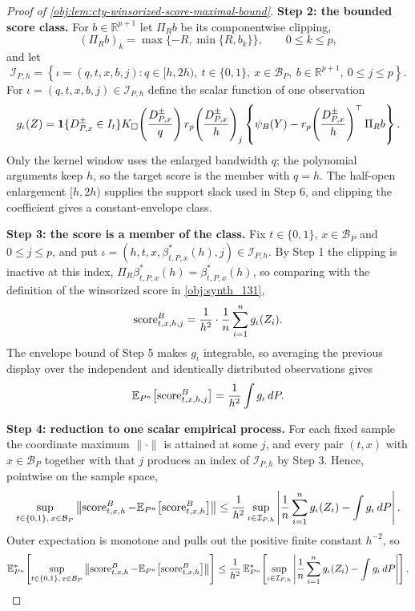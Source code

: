 \begin{proof}[Proof of \cref{obj:lem:cty-winsorized-score-maximal-bound}]
\textbf{Step 2: the bounded score class.}  For \(b\in\mathbb R^{p+1}\) let \(\Pi_R b\) be its componentwise clipping,
\[
(\Pi_R b)_k=\max\{-R,\min\{R,b_k\}\},\qquad 0\leq k\leq p,
\]
and let
\[
\mathcal I_{P,h}
=
\left\{
\iota=(q,t,x,b,j):
q\in[h,2h),\ t\in\{0,1\},\ x\in\mathcal B_P,\ b\in\mathbb R^{p+1},\ 0\leq j\leq p
\right\}.
\]
For \(\iota=(q,t,x,b,j)\in\mathcal I_{P,h}\) define the scalar function of one observation
\[
g_\iota(Z)
=
\mathbf 1\{D^{\pm}_{P,x}\in I_t\}
K_\square\!\left({D^{\pm}_{P,x}\over q}\right)
r_p\!\left({D^{\pm}_{P,x}\over h}\right)_j
\left\{
\psi_B(Y)-r_p\!\left({D^{\pm}_{P,x}\over h}\right)^\top\Pi_R b
\right\}.
\]
Only the kernel window uses the enlarged bandwidth \(q\); the polynomial arguments keep \(h\), so the target score is the member with \(q=h\).  The half-open enlargement \([h,2h)\) supplies the support slack used in Step 6, and clipping the coefficient gives a constant-envelope class.

\textbf{Step 3: the score is a member of the class.}  Fix \(t\in\{0,1\}\), \(x\in\mathcal B_P\) and \(0\leq j\leq p\), and put \(\iota=(h,t,x,\beta^*_{t,P,x}(h),j)\in\mathcal I_{P,h}\).  By Step 1 the clipping is inactive at this index, \(\Pi_R\beta^*_{t,P,x}(h)=\beta^*_{t,P,x}(h)\), so comparing with the definition of the winsorized score in \cref{obj:synth_131},
\[
\operatorname{score}^{B}_{t,x,h,j}
=
{1\over h^{2}}\cdot{1\over n}\sum_{i=1}^n g_\iota(Z_i).
\]
The envelope bound of Step 5 makes \(g_\iota\) integrable, so averaging the previous display over the independent and identically distributed observations gives
\[
\mathbb E_{P^n}\!\left[\operatorname{score}^{B}_{t,x,h,j}\right]
=
{1\over h^{2}}\int g_\iota\,dP .
\]

\textbf{Step 4: reduction to one scalar empirical process.}  For each fixed sample the coordinate maximum \(\lVert\cdot\rVert\) is attained at some \(j\), and every pair \((t,x)\) with \(x\in\mathcal B_P\) together with that \(j\) produces an index of \(\mathcal I_{P,h}\) by Step 3.  Hence, pointwise on the sample space,
\[
\sup_{t\in\{0,1\},\,x\in\mathcal B_P}
\left\lVert
\operatorname{score}^{B}_{t,x,h}
-\mathbb E_{P^n}\!\left[\operatorname{score}^{B}_{t,x,h}\right]
\right\rVert
\leq
{1\over h^{2}}
\sup_{\iota\in\mathcal I_{P,h}}
\left|
{1\over n}\sum_{i=1}^n g_\iota(Z_i)-\int g_\iota\,dP
\right| .
\]
Outer expectation is monotone and pulls out the positive finite constant \(h^{-2}\), so
\[
\mathbb E_{P^n}^{*}\!\left[
\sup_{t\in\{0,1\},\,x\in\mathcal B_P}
\left\lVert
\operatorname{score}^{B}_{t,x,h}
-\mathbb E_{P^n}\!\left[\operatorname{score}^{B}_{t,x,h}\right]
\right\rVert
\right]
\leq
{1\over h^{2}}\,
\mathbb E_{P^n}^{*}\!\left[
\sup_{\iota\in\mathcal I_{P,h}}
\left|
{1\over n}\sum_{i=1}^n g_\iota(Z_i)-\int g_\iota\,dP
\right|
\right].
\]


\end{proof}
